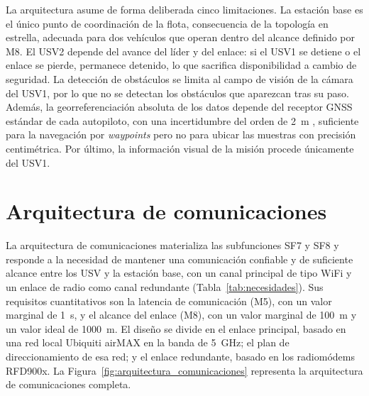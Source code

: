 La arquitectura asume de forma deliberada cinco limitaciones. La estación base es el único punto de coordinación 
de la flota, consecuencia de la topología en estrella, adecuada para dos vehículos que operan dentro del alcance 
definido por M8. El USV2 depende del avance del líder y del enlace: si el USV1 se detiene o el enlace se pierde, 
permanece detenido, lo que sacrifica disponibilidad a cambio de seguridad. La detección de obstáculos se limita al 
campo de visión de la cámara del USV1, por lo que no se detectan los obstáculos que aparezcan tras su paso. Además, la 
georreferenciación absoluta de los datos depende del receptor GNSS estándar de cada autopiloto, con una 
incertidumbre del orden de 2~m \cite{Cite29}, suficiente para la navegación por \textit{waypoints} pero no para 
ubicar las muestras con precisión centimétrica. Por último, la información visual de la misión procede únicamente 
del USV1.
 
\newpage
\FloatBarrier
 

\section{Arquitectura de comunicaciones}
\label{sec:diseno_comunicaciones}
 
La arquitectura de comunicaciones materializa las subfunciones SF7 y SF8 y responde a la necesidad de 
mantener una comunicación confiable y de suficiente alcance entre los USV y la estación base, con un canal 
principal de tipo WiFi y un enlace de radio como canal redundante (Tabla~\ref{tab:necesidades}). Sus 
requisitos cuantitativos son la latencia de comunicación (M5), con un valor marginal de 1~s, y el alcance 
del enlace (M8), con un valor marginal de 100~m y un valor ideal de 1000~m. El diseño se divide en el 
enlace principal, basado en una red local Ubiquiti airMAX en la banda de 5~GHz; el plan de direccionamiento 
de esa red; y el enlace redundante, basado en los radiomódems RFD900x. La Figura~\ref{fig:arquitectura_comunicaciones} 
representa la arquitectura de comunicaciones completa.

